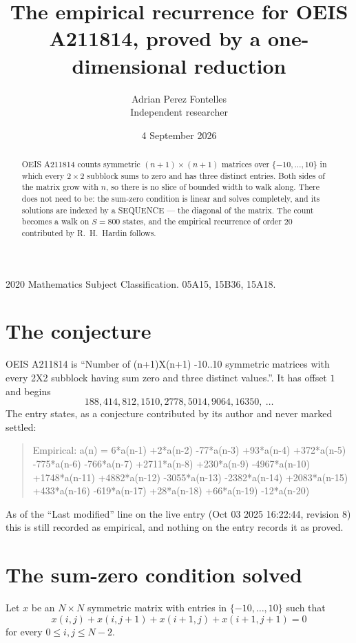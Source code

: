 \documentclass[11pt,a4paper]{article}
\title{The empirical recurrence for OEIS A211814, proved by a one-dimensional reduction}
\author{Adrian Perez Fontelles\\ \small Independent researcher}
\date{4 September 2026}
\theoremstyle{plain}
\theoremstyle{definition}
\begin{document}
\maketitle

\begin{abstract}
OEIS A211814 counts symmetric $(n+1)\times(n+1)$ matrices over
$\{-10,\dots,10\}$ in which every $2\times2$ subblock sums to zero and has three distinct
entries. Both sides of the matrix grow with $n$, so there is no slice of bounded width to walk
along. There does not need to be: the sum-zero condition is linear and solves completely, and
its solutions are indexed by a SEQUENCE --- the diagonal of the matrix. The count becomes a walk
on $S=800$ states, and the empirical recurrence of order $20$ contributed by R.~H.~Hardin
follows.
\end{abstract}

\noindent\small 2020 Mathematics Subject Classification. 05A15, 15B36, 15A18.\normalsize

\section{The conjecture}

OEIS A211814 is ``Number of (n+1)X(n+1) -10..10 symmetric matrices with every 2X2 subblock having sum zero and three distinct values.''. It has offset $1$ and begins
\[
188, 414, 812, 1510, 2778, 5014, 9064, 16350,\ \dots
\]
The entry states, as a conjecture contributed by its author and never marked settled:
\begin{quote}
Empirical: a(n) = 6*a(n-1) +2*a(n-2) -77*a(n-3) +93*a(n-4) +372*a(n-5) -775*a(n-6) -766*a(n-7) +2711*a(n-8) +230*a(n-9) -4967*a(n-10) +1748*a(n-11) +4882*a(n-12) -3055*a(n-13) -2382*a(n-14) +2083*a(n-15) +433*a(n-16) -619*a(n-17) +28*a(n-18) +66*a(n-19) -12*a(n-20)
\end{quote}
As of the ``Last modified'' line on the live entry (Oct 03 2025 16:22:44, revision 8) this is still
recorded as empirical, and nothing on the entry records it as proved.

\section{The sum-zero condition solved}

Let $x$ be an $N\times N$ symmetric matrix with entries in $\{-10,\dots,10\}$ such that
\[
x(i,j)+x(i,j{+}1)+x(i{+}1,j)+x(i{+}1,j{+}1)=0
\]
for every $0\le i,j\le N-2$.
\end{document}
